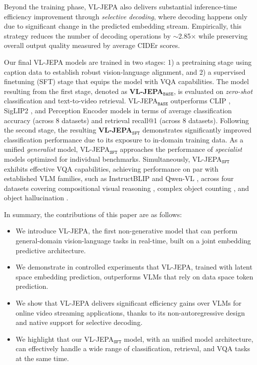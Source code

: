 Beyond the training phase, VL-JEPA also delivers substantial inference-time efficiency improvement through \emph{selective decoding}, where decoding happens only due to significant change in the predicted embedding stream. Empirically, this strategy reduces the number of decoding operations by $\sim$2.85$\times$ while preserving overall output quality measured by average CIDEr scores.


{Our final VL-JEPA models are trained in two stages: 1) a pretraining stage using caption data to establish robust vision-language alignment, and 2) a supervised finetuning (SFT) stage that equips the model with VQA capabilities. The model resulting from the first stage, denoted as \textbf{VL-JEPA$_\texttt{BASE}$},} is evaluated on \textit{zero-shot} classification and text-to-video retrieval. VL-JEPA$_\texttt{BASE}$ outperforms CLIP \citep{radford2021learning}, SigLIP2 \citep{tschannen2025siglip}, and Perception Encoder \citep{bolya2025perception} models in terms of average classification accuracy (across 8 datasets) and retrieval recall@1 (across 8 datasets). {Following the second stage, the resulting \textbf{VL-JEPA$_\texttt{SFT}$} demonstrates significantly improved classification performance due to its exposure to in-domain training data. As a unified \textit{generalist} model, VL-JEPA$_\texttt{SFT}$ approaches the performance of \textit{specialist} models optimized for individual benchmarks. Simultaneously, VL-JEPA$_\texttt{SFT}$ exhibits effective VQA capabilities, achieving performance on par with established VLM families}, such as InstructBLIP \citep{dai2023instructblip} and Qwen-VL \citep{bai2023qwen}, across four datasets covering compositional visual reasoning \citep{hudson2019gqa}, complex object counting \citep{acharya2019tallyqa}, and object hallucination \citep{li2023evaluating, li2025analyzing}. 

In summary, the contributions of this paper are as follows:

\begin{itemize}

    \item We introduce VL-JEPA, the first non-generative model that can perform general-domain vision-language tasks in real-time, built on a joint embedding predictive architecture. 
    
    \item We demonstrate in controlled experiments that VL-JEPA, trained with latent space embedding prediction, outperforms VLMs that rely on data space token prediction.
    
    \item We show that VL-JEPA delivers significant efficiency gains over VLMs for online video streaming applications, thanks to its non-autoregressive design and native support for selective decoding.
    
    \item {We highlight that our VL-JEPA$_\texttt{SFT}$ model, with an unified model architecture, can effectively handle a wide range of classification, retrieval, and VQA tasks at the same time.}

\end{itemize}
